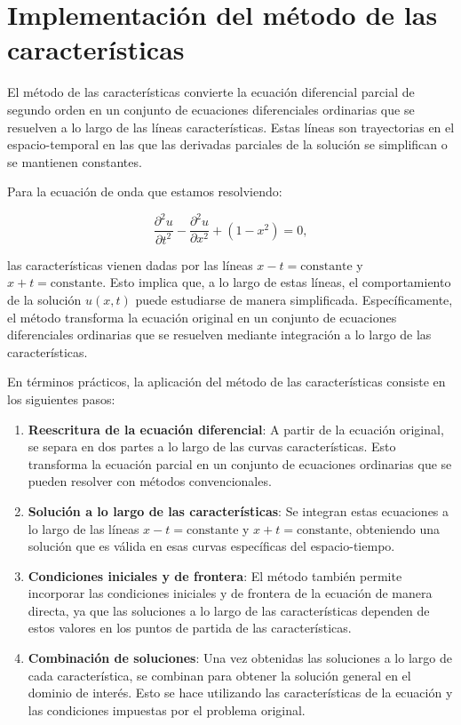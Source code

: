 \newpage
\section{Implementación del método de las características}
El método de las características convierte la ecuación diferencial parcial de segundo orden en un conjunto de ecuaciones diferenciales ordinarias que se resuelven a lo largo de las líneas características. Estas líneas son trayectorias en el espacio-temporal en las que las derivadas parciales de la solución se simplifican o se mantienen constantes.

Para la ecuación de onda que estamos resolviendo:

\begin{equation}
    \frac{\partial^2 u}{\partial t^2} - \frac{\partial^2 u}{\partial x^2} + (1 - x^2) = 0,
\end{equation}

las características vienen dadas por las líneas $x - t = \text{constante}$ y $x + t = \text{constante}$. Esto implica que, a lo largo de estas líneas, el comportamiento de la solución $u(x, t)$ puede estudiarse de manera simplificada. Específicamente, el método transforma la ecuación original en un conjunto de ecuaciones diferenciales ordinarias que se resuelven mediante integración a lo largo de las características.

En términos prácticos, la aplicación del método de las características consiste en los siguientes pasos:

\begin{enumerate}
    \item \textbf{Reescritura de la ecuación diferencial}: A partir de la ecuación original, se separa en dos partes a lo largo de las curvas características. Esto transforma la ecuación parcial en un conjunto de ecuaciones ordinarias que se pueden resolver con métodos convencionales.
    
    \item \textbf{Solución a lo largo de las características}: Se integran estas ecuaciones a lo largo de las líneas $x - t = \text{constante}$ y $x + t = \text{constante}$, obteniendo una solución que es válida en esas curvas específicas del espacio-tiempo.
    
    \item \textbf{Condiciones iniciales y de frontera}: El método también permite incorporar las condiciones iniciales y de frontera de la ecuación de manera directa, ya que las soluciones a lo largo de las características dependen de estos valores en los puntos de partida de las características.
    
    \item \textbf{Combinación de soluciones}: Una vez obtenidas las soluciones a lo largo de cada característica, se combinan para obtener la solución general en el dominio de interés. Esto se hace utilizando las características de la ecuación y las condiciones impuestas por el problema original.
\end{enumerate}

